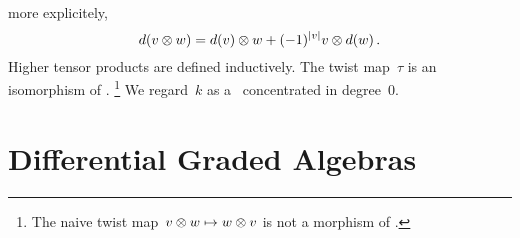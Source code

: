 \documentclass[a4paper,10pt,headings=standardclasses]{scrartcl}
\begin{document}
more explicitely,
\[
  d(v \otimes w)
  =
  d(v) \otimes w + (-1)^{\lvert v\rvert} v \otimes d(w) \,.
\]
Higher tensor products are defined inductively.
The twist map~$\tau$ is an isomorphism of {\dgvs}.%
\footnote{The naive twist map~$v \otimes w \mapsto w \otimes v$ is not a morphism of {\dgvs}.}
We regard~$k$ as a~{\dgv} concentrated in degree~$0$.







\section{Differential Graded Algebras}
\end{document}
